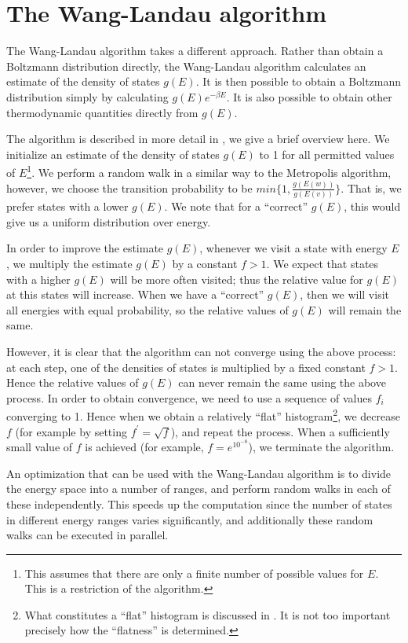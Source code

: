 \documentclass{article}
\begin{document}
\section{The Wang-Landau algorithm}
The Wang-Landau algorithm takes a different approach.
Rather than obtain a Boltzmann distribution directly, the Wang-Landau algorithm calculates an estimate of the density of states $g(E)$.
It is then possible to obtain a Boltzmann distribution simply by calculating $g(E)e^{-\beta E}$.
It is also possible to obtain other thermodynamic quantities directly from $g(E)$.

The algorithm is described in more detail in \cite{WangLandau}, we give a brief overview here.
We initialize an estimate of the density of states $g(E)$ to 1 for all permitted values of $E$\footnote{This assumes that there are only a finite number of possible values for $E$. This is a restriction of the algorithm.}.
We perform a random walk in a similar way to the Metropolis algorithm, however, we choose the transition probability to be $min\{1, \frac{g(E(w))}{g(E(v))}\}$.
That is, we prefer states with a lower $g(E)$.
We note that for a ``correct'' $g(E)$, this would give us a uniform distribution over energy.

In order to improve the estimate $g(E)$, whenever we visit a state with energy $E$, we multiply the estimate $g(E)$ by a constant $f>1$.
We expect that states with a higher $g(E)$ will be more often visited; thus the relative value for $g(E)$ at this states will increase.
When we have a ``correct'' $g(E)$, then we will visit all energies with equal probability, so the relative values of $g(E)$ will remain the same.

However, it is clear that the algorithm can not converge using the above process: at each step, one of the densities of states is multiplied by a fixed constant $f>1$.
Hence the relative values of $g(E)$ can never remain the same using the above process.
In order to obtain convergence, we need to use a sequence of values $f_i$ converging to 1.
Hence when we obtain a relatively ``flat'' histogram\footnote{What constitutes a ``flat'' histogram is discussed in \cite{WangLandau}. It is not too important precisely how the ``flatness'' is determined.}, we decrease $f$ (for example by setting $f^\prime = \sqrt{f}$), and repeat the process.
When a sufficiently small value of $f$ is achieved (for example, $f = e^{10^{-8}}$), we terminate the algorithm.

An optimization that can be used with the Wang-Landau algorithm is to divide the energy space into a number of ranges, and perform random walks in each of these independently.
This speeds up the computation since the number of states in different energy ranges varies significantly, and additionally these random walks can be executed in parallel.
\end{document}
